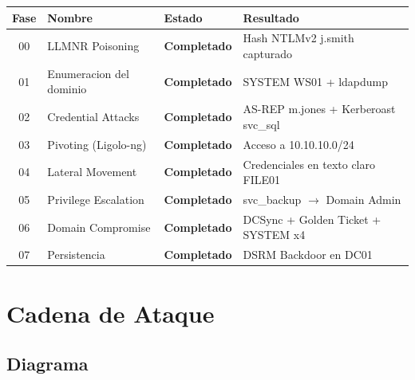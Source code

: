 \documentclass[11pt,a4paper]{article}
\begin{document}
\begin{center}
\begin{tabular}{clll}
\toprule
\textbf{Fase} & \textbf{Nombre} & \textbf{Estado} & \textbf{Resultado} \\
\midrule
00 & LLMNR Poisoning         & \textcolor{low}{\textbf{Completado}} & Hash NTLMv2 j.smith capturado \\
01 & Enumeracion del dominio & \textcolor{low}{\textbf{Completado}} & SYSTEM WS01 + ldapdump \\
02 & Credential Attacks      & \textcolor{low}{\textbf{Completado}} & AS-REP m.jones + Kerberoast svc\_sql \\
03 & Pivoting (Ligolo-ng)    & \textcolor{low}{\textbf{Completado}} & Acceso a 10.10.10.0/24 \\
04 & Lateral Movement        & \textcolor{low}{\textbf{Completado}} & Credenciales en texto claro FILE01 \\
05 & Privilege Escalation    & \textcolor{low}{\textbf{Completado}} & svc\_backup $\to$ Domain Admin \\
06 & Domain Compromise       & \textcolor{low}{\textbf{Completado}} & DCSync + Golden Ticket + SYSTEM x4 \\
07 & Persistencia            & \textcolor{low}{\textbf{Completado}} & DSRM Backdoor en DC01 \\
\bottomrule
\end{tabular}
\end{center}

\newpage

\section{Cadena de Ataque}

\subsection{Diagrama}
\end{document}
